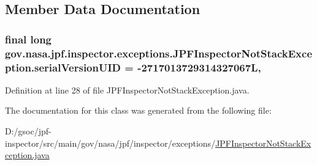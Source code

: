 \subsection{Member Data Documentation}
\subsubsection[{\texorpdfstring{serial\+Version\+U\+ID}{serialVersionUID}}]{\setlength{\rightskip}{0pt plus 5cm}final long gov.\+nasa.\+jpf.\+inspector.\+exceptions.\+J\+P\+F\+Inspector\+Not\+Stack\+Exception.\+serial\+Version\+U\+ID = -\/2717013729314327067L\hspace{0.3cm}{\ttfamily [static]}, {\ttfamily [private]}}\hypertarget{classgov_1_1nasa_1_1jpf_1_1inspector_1_1exceptions_1_1_j_p_f_inspector_not_stack_exception_a992a7fb7e1d73cb6ed11c6ddfcd394b3}{}\label{classgov_1_1nasa_1_1jpf_1_1inspector_1_1exceptions_1_1_j_p_f_inspector_not_stack_exception_a992a7fb7e1d73cb6ed11c6ddfcd394b3}


Definition at line 28 of file J\+P\+F\+Inspector\+Not\+Stack\+Exception.\+java.



The documentation for this class was generated from the following file\+:\begin{DoxyCompactItemize}
\item 
D\+:/gsoc/jpf-\/inspector/src/main/gov/nasa/jpf/inspector/exceptions/\hyperlink{_j_p_f_inspector_not_stack_exception_8java}{J\+P\+F\+Inspector\+Not\+Stack\+Exception.\+java}\end{DoxyCompactItemize}
